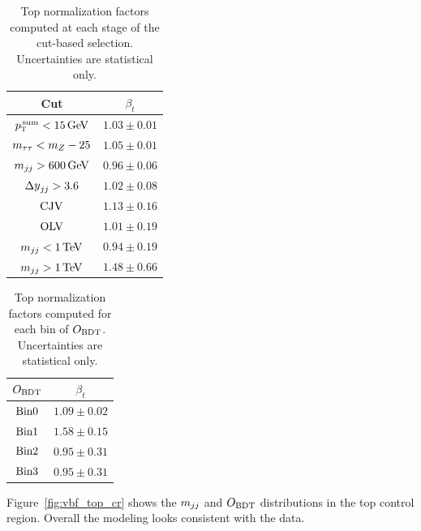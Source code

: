 \begin{table}[h!]
\centering
\captionsetup{justification=centering}
\begin{tabular}{|c|c|}
\hline
Cut & $\beta_t$ \\ \hline
$\pTtot < 15 \GeV$ & $1.03 \pm 0.01$ \\ \hline
$m_{\tau\tau} < m_Z - 25$ & $1.05 \pm 0.01$ \\ \hline
$\mjj > 600 \GeV$ & $0.96 \pm 0.06$ \\ \hline
$\dyjj > 3.6 $ & $1.02 \pm 0.08$ \\ \hline
$\rm CJV$ & $1.13 \pm 0.16$ \\ \hline
$\rm OLV$ & $1.01 \pm 0.19$ \\ \hline
$\mjj < 1 \TeV$ & $0.94 \pm 0.19$ \\ \hline
$\mjj > 1 \TeV$ & $1.48 \pm 0.66$ \\ \hline 
\end{tabular}
\caption{Top normalization factors computed at each stage of the cut-based selection. Uncertainties are statistical only.}
\label{tab:vbf_cb_topnf}
\end{table}

\begin{table}[h!]
\centering
\captionsetup{justification=centering}
\begin{tabular}{|c|c|}
\hline
$O_{\rm BDT}$ & $\beta_t$ \\ \hline
$\rm Bin 0$ & $1.09 \pm 0.02$ \\ \hline
$\rm Bin 1$ & $1.58 \pm 0.15$ \\ \hline
$\rm Bin 2$ & $0.95 \pm 0.31$ \\ \hline
$\rm Bin 3$ & $0.95 \pm 0.31$ \\ \hline
\end{tabular}
\caption{Top normalization factors computed for each bin of $O_{\rm BDT}$. Uncertainties are statistical only.}
\label{tab:vbf_bdt_topnf}
\end{table}

Figure~\ref{fig:vbf_top_cr} shows the $m_{jj}$ and $O_{\rm BDT}$ distributions in the top control region. Overall the modeling looks consistent with the data.

